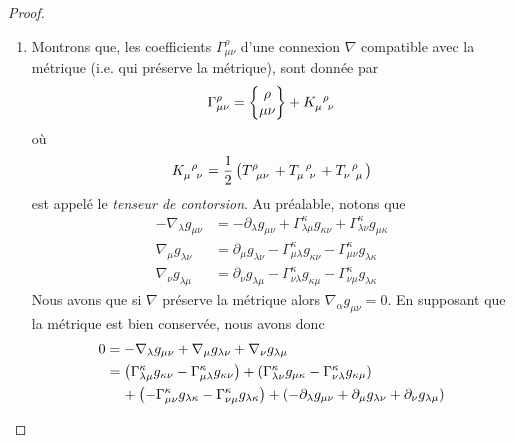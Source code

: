 \documentclass[a4paper,11pt]{report}
\theoremstyle{definition}
\theoremstyle{plain}
\theoremstyle{definition}
\theoremstyle{remark}
\newcommand{\p}{\partial}
\newcommand{\chris}[3]{\begin{Bmatrix}#1\\#2#3\end{Bmatrix}}
\begin{document}
\begin{proof}
\begin{enumerate}[label = \textit{\roman*)}]
                            \item Montrons que, les coefficients $\Gamma^\rho_{\mu\nu}$ d'une connexion $\nabla$ compatible avec la métrique (i.e. qui préserve la métrique), sont donnée par 
                            \begin{equation}
                                \Gamma^\rho_{\mu\nu} = \chris{\rho}{\mu}{\nu}+
                                K\indices{_\mu^\rho_\nu}
                            \end{equation}
                            où
                            \begin{equation}
                                K\indices{_\mu^\rho_\nu} = \frac{1}{2}\left( T\indices{^\rho_\mu_\nu}+T\indices{_\mu^\rho_\nu} + T\indices{_\nu^\rho_\mu} \right)
                            \end{equation}
                            est appelé le \textit{tenseur de contorsion}. Au préalable, notons que 
                            \begin{align}
                                -\nabla_{\lambda}g_{\mu\nu} &= -\p_\lambda g_{\mu\nu}+\Gamma^\kappa_{\lambda\mu}g_{\kappa\nu}+\Gamma^\kappa_{\lambda\nu}g_{\mu\kappa}\\
                                \nabla_{\mu}g_{\lambda\nu} &= \p_\mu g_{\lambda\nu}-\Gamma^\kappa_{\mu\lambda}g_{\kappa\nu}-\Gamma^\kappa_{\mu\nu}g_{\lambda\kappa}\\
                                \nabla_{\nu}g_{\lambda\mu} &= \p_\nu g_{\lambda\mu}-\Gamma^\kappa_{\nu\lambda}g_{\kappa\mu}-\Gamma^\kappa_{\nu\mu}g_{\lambda\kappa}
                            \end{align}
                            Nous avons que si $\nabla$ préserve la métrique alors $\nabla_{\alpha}g_{\mu\nu} = 0$. En supposant que la métrique est bien conservée, nous avons donc
                            \begin{align}
                                 0 &=  -\nabla_{\lambda}g_{\mu\nu}+ \nabla_{\mu}g_{\lambda\nu}+ \nabla_{\nu}g_{\lambda\mu}\\
                                 &= \left(\Gamma^\kappa_{\lambda\mu}g_{\kappa\nu} -\Gamma^\kappa_{\mu\lambda}g_{\kappa\nu}\right) +\left(\Gamma^\kappa_{\lambda\nu}g_{\mu\kappa} -\Gamma^\kappa_{\nu\lambda}g_{\kappa\mu}\right)\\
                                 &\hspace{0.4cm}+\left(-\Gamma^\kappa_{\mu\nu}g_{\lambda\kappa}-\Gamma^\kappa_{\nu\mu}g_{\lambda\kappa}\right) + \left( -\p_\lambda g_{\mu\nu}+\p_\mu g_{\lambda\nu} + \p_\nu g_{\lambda\mu}\right)\\

\end{align}
\end{enumerate}
\end{proof}
\end{document}
